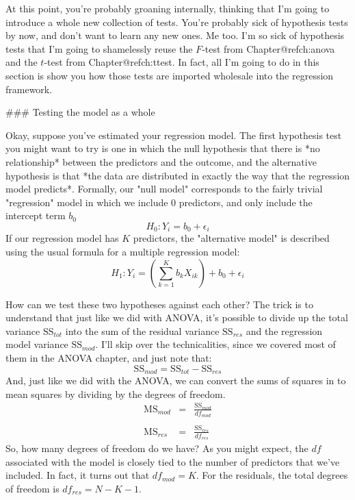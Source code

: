 At this point, you're probably groaning internally, thinking that I'm going to introduce a whole new collection of tests. You're probably sick of hypothesis tests by now, and don't want to learn any new ones. Me too. I'm so sick of hypothesis tests that I'm going to shamelessly reuse the $F$-test from Chapter@refch:anova and the $t$-test from Chapter@refch:ttest. In fact, all I'm going to do in this section is show you how those tests are imported wholesale into the regression framework.  

### Testing the model as a whole

Okay, suppose you've estimated your regression model. The first hypothesis test you might want to try is one in which the null hypothesis that there is *no relationship* between the predictors and the outcome, and the alternative hypothesis is that *the data are distributed in exactly the way that the regression model predicts*. Formally, our "null model" corresponds to the fairly trivial "regression" model in which we include 0 predictors, and only include the intercept term $b_0$
$$
H_0: Y_i = b_0 + \epsilon_i
$$
If our regression model has $K$ predictors, the "alternative model" is described using the usual formula for a multiple regression model:
$$
H_1: Y_i = \left( \sum_{k=1}^K b_{k} X_{ik} \right) + b_0 + \epsilon_i
$$

How can we test these two hypotheses against each other? The trick is to understand that just like we did with ANOVA, it's possible to divide up the total variance $\mbox{SS}_{tot}$ into the sum of the residual variance $\mbox{SS}_{res}$ and the regression model variance $\mbox{SS}_{mod}$. I'll skip over the technicalities, since we covered most of them in the ANOVA chapter, and just note that:
$$
\mbox{SS}_{mod} = \mbox{SS}_{tot} - \mbox{SS}_{res}
$$
And, just like we did with the ANOVA, we can convert the sums of squares in to mean squares by dividing by the degrees of freedom. 
$$\begin{array}{rcl}
\mbox{MS}_{mod} &=& \displaystyle\frac{\mbox{SS}_{mod} }{df_{mod}} \\ \\
\mbox{MS}_{res} &=& \displaystyle\frac{\mbox{SS}_{res} }{df_{res}} 
\end{array}
$$ 
So, how many degrees of freedom do we have? As you might expect, the $df$ associated with the model is closely tied to the number of predictors that we've included. In fact, it turns out that $df_{mod} = K$. For the residuals, the total degrees of freedom is $df_{res} = N -K - 1$. 

